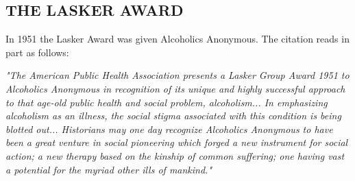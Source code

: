 

\subsection*{THE LASKER AWARD}

\begin{biblechapter}
\verse In 1951 the Lasker Award was given Alcoholics Anonymous.
\verse The citation reads in part as follows:


    \emph{"The American Public Health Association 
    presents a Lasker Group Award 1951 to Alcoholics Anonymous
    in recognition of its unique and highly successful approach 
    to that age-old public health and social problem,
    alcoholism...
\verse In emphasizing alcoholism as an illness,
    the social stigma associated with this condition is being
    blotted out...
\verse Historians may one day recognize Alcoholics Anonymous 
    to have been a great venture in social pioneering 
    which forged a new instrument for social action; 
    a new therapy based on the kinship of common suffering; 
    one having vast a potential for the myriad other ills of mankind."
}
\end{biblechapter}
